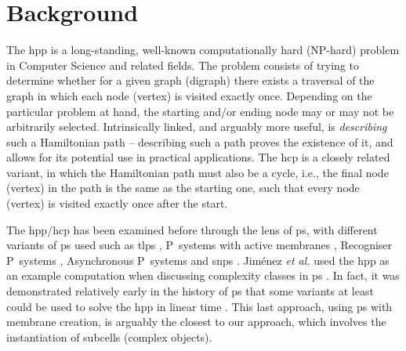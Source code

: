 \section{Background}

The \gls{hpp} is a long-standing, well-known computationally hard (NP-hard) problem in Computer Science and related fields.  The problem consists of trying to determine whether for a given graph (digraph) there exists a traversal of the graph in which each node (vertex) is visited exactly once.  Depending on the particular problem at hand, the starting and/or ending node may or may not be arbitrarily selected.  Intrinsically linked, and arguably more useful, is \emph{describing} such a Hamiltonian path -- describing such a path proves the existence of it, and allows for its potential use in practical applications.  The \gls{hcp} is a closely related variant, in which the Hamiltonian path must also be a cycle, i.e., the final node (vertex) in the path is the same as the starting one, such that every node (vertex) is visited exactly once after the start.

The \gls{hpp}/\gls{hcp} has been examined before through the lens of \gls{ps}, with different variants of \gls{ps} used such as \gls{tlps} \cite{Martin-Vide2003}, P~systems with active membranes \cite{Pan2006,Song2013}, Recogniser P~systems \cite{Chen2009}, Asynchronous P~systems \cite{Tagawa2012} and \gls{snps} \cite{Xue2013}.  Jim\'enez \textit{et al.} used the \gls{hpp} as an example computation when discussing complexity classes in \gls{ps} \cite{Jimenez2003}.  In fact, it was demonstrated relatively early in the history of \gls{ps} that some variants at least could be used to solve the \gls{hpp} in linear time \cite{Mutyam2001}.  This last approach, using \gls{ps} with membrane creation, is arguably the closest to our approach, which involves the instantiation of subcells (complex objects).

